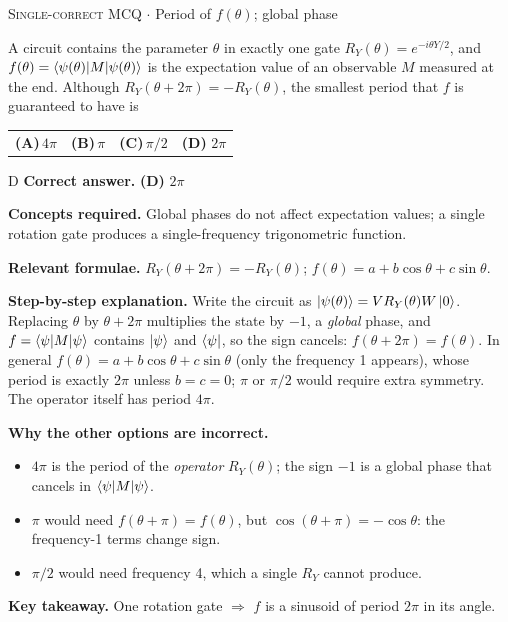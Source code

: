 \documentclass[11pt,a4paper]{article}
\newcommand{\optlabel}[1]{\textbf{(#1)}}
\newcommand{\correctlabel}[1]{\textcolor{okgreen}{\textbf{(#1)}\,\ding{51}}}
\newenvironment{qitem}[1]{\begin{list}{}{\setlength{\leftmargin}{3.3em}\setlength{\labelwidth}{3.1em}%
  \setlength{\labelsep}{0.2em}\setlength{\topsep}{3pt}\setlength{\parsep}{3pt}}\item[\textbf{Q.#1}\hfill]}{\end{list}}
\newcommand{\qsep}{\par\vspace{2pt}{\color{black!15}\hrule}\vspace{4pt}}
\newcommand{\qmeta}[2]{{\footnotesize\color{black!60}\textsc{#1} \;$\cdot$\; #2}\par}
\begin{document}
\begin{qitem}{23}
\qmeta{Single-correct MCQ}{Period of $f(\theta)$; global phase}
A circuit contains the parameter $\theta$ in exactly one gate $R_Y(\theta) = e^{-i\theta Y/2}$, and
$f(\theta) = \braket{\psi(\theta)|M|\psi(\theta)}$ is the expectation value of an observable $M$ measured at the end. Although
$R_Y(\theta + 2\pi) = -R_Y(\theta)$, the smallest period that $f$ is guaranteed to have is
\par\smallskip\noindent\begin{tabularx}{\linewidth}{@{}*{4}{L}@{}}
\optlabel{A}\,$4\pi$ & \optlabel{B}\,$\pi$ & \optlabel{C}\,$\pi/2$ & \correctlabel{D}\,$2\pi$
\end{tabularx}
\end{qitem}
\begin{solbox}{D}
\textbf{\color{brand}Correct answer.} \textcolor{okgreen}{\textbf{(D)}} $2\pi$

\textbf{\color{brand}Concepts required.} Global phases do not affect expectation values; a single rotation gate produces a single-frequency trigonometric function.

\textbf{\color{brand}Relevant formulae.} $R_Y(\theta + 2\pi) = -R_Y(\theta)$; $f(\theta) = a + b\cos\theta + c\sin\theta$.

\textbf{\color{brand}Step-by-step explanation.} Write the circuit as $\ket{\psi(\theta)} = V R_Y(\theta) W\ket0$. Replacing $\theta$ by $\theta + 2\pi$ multiplies the state by
$-1$, a \emph{global} phase, and $f = \braket{\psi|M|\psi}$ contains $\ket\psi$ and $\bra\psi$, so the sign cancels:
$f(\theta + 2\pi) = f(\theta)$. In general $f(\theta) = a + b\cos\theta + c\sin\theta$ (only the frequency 1 appears), whose
period is exactly $2\pi$ unless $b = c = 0$; $\pi$ or $\pi/2$ would require extra symmetry. The operator itself has period $4\pi$.

\textbf{\color{brand}Why the other options are incorrect.}
\begin{itemize}[leftmargin=2.4em, itemsep=1pt, topsep=2pt]
\item[\textbf{(A)}] $4\pi$ is the period of the \emph{operator} $R_Y(\theta)$; the sign $-1$ is a global phase that cancels in $\braket{\psi|M|\psi}$.
\item[\textbf{(B)}] $\pi$ would need $f(\theta + \pi) = f(\theta)$, but $\cos(\theta + \pi) = -\cos\theta$: the frequency-1 terms change sign.
\item[\textbf{(C)}] $\pi/2$ would need frequency 4, which a single $R_Y$ cannot produce.
\end{itemize}
\textbf{\color{brand}Key takeaway.} One rotation gate $\Rightarrow$ $f$ is a sinusoid of period $2\pi$ in its angle.
\end{solbox}
\qsep
\end{document}

